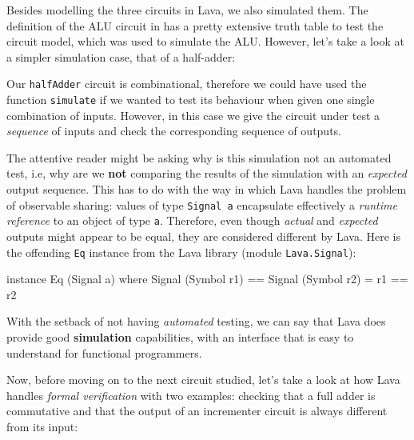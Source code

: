 \documentclass[a4paper]{article}
\begin{document}
                Besides modelling the three circuits in Lava, we also simulated them. The definition
                of the ALU circuit in \cite{nand2tetris-book} has a pretty extensive truth table to
                test the circuit model, which was used to simulate the ALU. However, let's take a
                look at a simpler simulation case, that of a half-adder:
                

                Our \texttt{halfAdder} circuit is combinational, therefore we could have used the
                function \texttt{simulate} if we wanted to test its behaviour when given one single
                combination of inputs. However, in this case we give the circuit under test a
                \emph{sequence} of inputs and check the corresponding sequence of outputs.

                The attentive reader might be asking why is this simulation not an automated test,
                i.e, why are we \textbf{not} comparing the results of the simulation with an
                \emph{expected} output sequence. This has to do with the way in which Lava handles
                the problem of observable sharing: values of type \texttt{Signal a} encapsulate
                effectively a \emph{runtime reference} to an object of type \texttt{a}. Therefore,
                even though \emph{actual} and \emph{expected} outputs might appear to be equal, they
                are considered different by Lava. Here is the offending \texttt{Eq} instance from
                the Lava library (module \texttt{Lava.Signal}):
                \begin{haskellcode}
    instance Eq (Signal a) where
        Signal (Symbol r1) == Signal (Symbol r2) = r1 == r2
                \end{haskellcode}

                With the setback of not having \emph{automated} testing, we can say that Lava does
                provide good \textbf{simulation} capabilities, with an interface that is easy to
                understand for functional programmers.

                Now, before moving on to the next circuit
                studied, let's take a look at how Lava handles \emph{formal verification} with two
                examples: checking that a full adder is commutative and that the output of an
                incrementer circuit is always different from its input:
                
\end{document}
